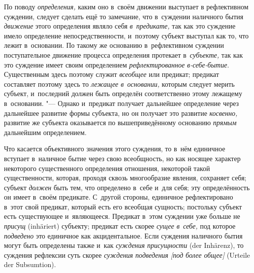 По поводу {\em определения,} каким оно в~своём движении выступает в
рефлективном суждении, следует сделать ещё то замечание, что в~суждении
наличного бытия {\em движение} этого определения являло себя {\em в~предикате,}
так как это суждение имело определение непосредственности, и~поэтому субъект
выступал как то, что лежит в~основании. По такому же основанию в~рефлективном
суждении поступательное движение процесса определения протекает
в~{\em субъекте,} так как это суждение имеет своим определением
{\em рефлектированное в-себе-бытие}. Существенным здесь поэтому служит {\em
всеобщее} или предикат; предикат составляет поэтому здесь то {\em лежащее
в~основании,} которым следует мерить субъект, и~последний должен быть определён
соответственно этому лежащему в~основании. "--- Однако и~предикат получает
дальнейшее определение через дальнейшее развитие формы субъекта, но он получает
это развитие {\em косвенно,} развитие же субъекта оказывается по
вышеприведённому основанию {\em прямым} дальнейшим определением.

Что касается объективного значения этого суждения, то в~нём
единичное вступает в~наличное бытие через свою всеобщность, но как носящее
характер некоторого существенного определения отношения, некоторой такой
существенности, которая, проходя сквозь многообразие явления, сохраняет
себя; субъект {\em должен} быть тем, что определено в~себе и~для себя; эту
определённость он имеет в~своём предикате. С~другой стороны, единичное
рефлектировано в~этот свой предикат, который есть его всеобщая сущность;
постольку субъект есть существующее и~являющееся. Предикат в~этом суждении
уже больше не {\em присущ} (inhäriert) субъекту; предикат есть скорее
{\em сущее в~себе,} под которое {\em подведено} это единичное как
акцидентальное. Если суждения наличного бытия могут быть определены также
и~как {\em суждения присущности} (der Inhärenz), то суждения рефлексии суть
скорее {\em суждения подведения [под более общее]} (Urteile der Subsumtion).

